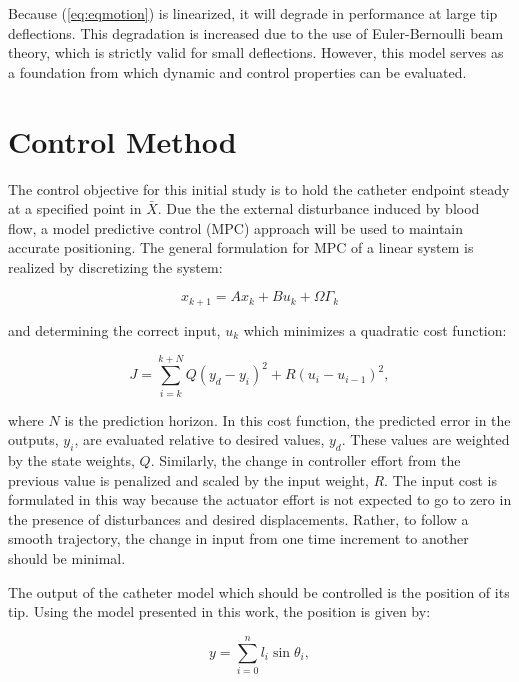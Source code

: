 \documentclass[letterpaper,10pt,conference]{ieeeconf}   %
\begin{document}
Because (\ref{eq:eqmotion}) is linearized, it will degrade in performance at large tip deflections. This degradation is increased due to the use of Euler-Bernoulli beam theory, which is strictly valid for small deflections. However, this model serves as a foundation from which dynamic and control properties can be evaluated.

\section{Control Method}
\label{sec:control}

The control objective for this initial study is to hold the catheter endpoint steady at a specified point in $\bar{X}$. Due the the external disturbance induced by blood flow, a model predictive control (MPC) approach will be used to maintain accurate positioning. The general formulation for MPC of a linear system is realized by discretizing the system:

\begin{equation}
x_{k+1} = A x_k + B u_k + \Omega \Gamma_k
\label{eq:discrete_ss}
\end{equation}

and determining the correct input, $u_k$ which minimizes a quadratic cost function:

\begin{equation}
\label{eq:costfunction}
J = \sum_{i=k}^{k+N} Q (y_d - y_i)^2 + R (u_i - u_{i-1})^2,
\end{equation}

where $N$ is the prediction horizon. In this cost function, the predicted error in the outputs, $y_i$, are evaluated relative to desired values, $y_d$. These values are weighted by the state weights, $Q$. Similarly, the change in controller effort from the previous value is penalized and scaled by the input weight, $R$. The input cost is formulated in this way because the actuator effort is not expected to go to zero in the presence of disturbances and desired displacements. Rather, to follow a smooth trajectory, the change in input from one time increment to another should be minimal. 

The output of the catheter model which should be controlled is the position of its tip. Using the model presented in this work, the position is given by:

\begin{equation}
\label{eq:y-output}
y = \sum_{i=0}^{n} l_i \sin{\theta_i},
\end{equation}
\end{document}
